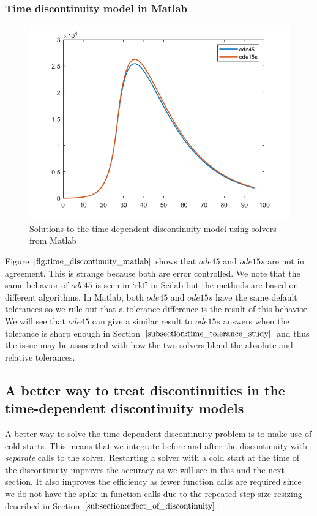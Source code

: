 \subsubsection{Time discontinuity model in Matlab}
\begin{figure}[H]
\centering
\includegraphics[width=0.7\linewidth]{./figures/time_discontinuity_matlab}
\caption{Solutions to the time-dependent discontinuity model using solvers from Matlab}
\label{fig:time_discontinuity_matlab}
\end{figure}
Figure $\ref{fig:time_discontinuity_matlab}$ shows that $ode45$ and $ode15s$ are not in agreement. This is strange because both are error controlled. We note that the same behavior of $ode45$ is seen in `rkf' in Scilab but the methods are based on different algorithms. In Matlab, both $ode45$ and $ode15s$ have the same default tolerances so we rule out that a tolerance difference is the result of this behavior. We will see that $ode45$ can give a similar result to $ode15s$ answers when the tolerance is sharp enough in Section $\ref{subsection:time_tolerance_study}$ and thus the issue may be associated with how the two solvers blend the absolute and relative tolerances.

\subsection{A better way to treat discontinuities in the time-dependent discontinuity models}
\label{subsection:time_disc_handling}
A better way to solve the time-dependent discontinuity problem is to make use of cold starts. This means that we integrate before and after the discontinuity with \emph{separate} calls to the solver. Restarting a solver with a cold start at the time of the discontinuity improves the accuracy as we will see in this and the next section. It also improves the efficiency as fewer function calls are required since we do not have the spike in function calls due to the repeated step-size resizing described in Section $\ref{subsection:effect_of_discontinuity}$.

